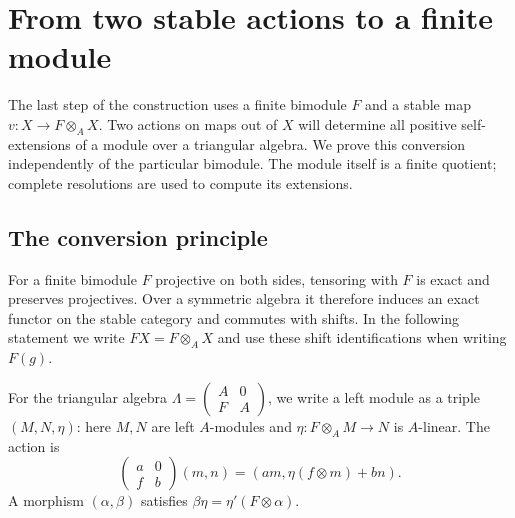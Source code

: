 \section{From two stable actions to a finite module}\label{conv:section}

The last step of the construction uses a finite bimodule $F$ and a stable
map $v:X\to F\otimes_A X$.  Two actions on maps out of $X$ will determine
all positive self-extensions of a module over a triangular algebra.  We
prove this conversion independently of the particular bimodule.  The
module itself is a finite quotient; complete resolutions are used to
compute its extensions.

\subsection{The conversion principle}

For a finite bimodule $F$ projective on both sides, tensoring with $F$
is exact and preserves projectives.  Over a symmetric algebra it
therefore induces an exact functor on the stable category and commutes
with shifts.  In the following statement we write $FX=F\otimes_A X$
and use these shift identifications when writing $F(g)$.

For the triangular algebra $\Lambda=\begin{pmatrix}A&0\\F&A\end{pmatrix}$,
we write a left module as a triple $(M,N,\eta)$: here $M,N$ are left
$A$-modules and $\eta:F\otimes_A M\to N$ is $A$-linear.  The action is
\[
 \begin{pmatrix}a&0\\f&b\end{pmatrix}(m,n)
       =(am,\eta(f\otimes m)+bn).
\]
A morphism $(\alpha,\beta)$ satisfies
$\beta\eta=\eta'(F\otimes\alpha)$.

